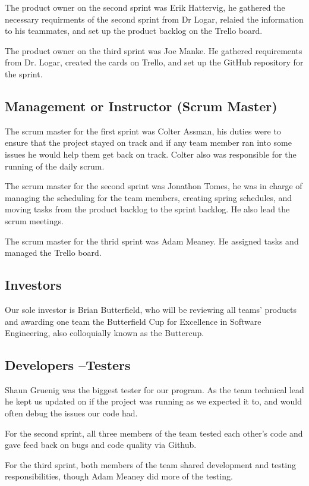 The product owner on the second sprint was Erik Hattervig, he gathered the necessary requirments of the
second sprint from Dr Logar, relaied the information to his teammates, and set up the product backlog on
the Trello board.

The product owner on the third sprint was Joe Manke. He gathered requirements from Dr. Logar, created the cards on Trello, and set up the GitHub repository for the sprint.

\subsection{Management or Instructor (Scrum Master)}
The scrum master for the first sprint was Colter Assman, his duties were to ensure that the project 
stayed on track and if any team member ran into some issues he would help them get back on track.   
Colter also was responsible for the running of the daily scrum.

The scrum master for the second sprint was Jonathon Tomes,  he was in charge of managing the scheduling
for the team members, creating spring schedules, and moving tasks from the product backlog to the sprint backlog.
He also lead the scrum meetings.

The scrum master for the thrid sprint was Adam Meaney. He assigned tasks and managed the Trello board.

\subsection{Investors}
Our sole investor is Brian Butterfield, who will be reviewing all teams' products and awarding one team the Butterfield Cup for Excellence in Software Engineering, also colloquially known as the Buttercup.

\subsection{Developers --Testers}
Shaun Gruenig was the biggest tester for our program.   As the team technical lead 
he kept us updated on if the project was running as we expected it to, and would 
often debug the issues our code had.

For the second sprint, all three members of the team tested each other's code and gave feed back on bugs and
code quality via Github.

For the third sprint, both members of the team shared development and testing responsibilities, though Adam Meaney did more of the testing.


